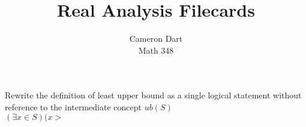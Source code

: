 \documentclass[12pt]{article}
\newenvironment{question}[2][Question]{\begin{trivlist}
\item[\hskip \labelsep {\bfseries #1}\hskip \labelsep {\bfseries #2.}]}{\end{trivlist}}
\begin{document}
  
\title{Real Analysis Filecards}
\author{Cameron Dart\\ 
Math 348} 
 
\maketitle

\begin{question}{1}
Rewrite the definition of least upper bound as a single logical statement without reference to the intermediate concept $ub(S)$\\
$(\exists x \in S)(x > $
\end{question}
%
\end{document}
